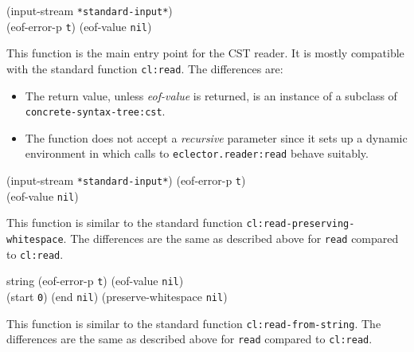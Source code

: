  {\optional (input-stream \texttt{*standard-input*})\\
  (eof-error-p \texttt{t})
  (eof-value \texttt{nil})}

This function is the main entry point for the CST reader.  It is
mostly compatible with the standard \commonlisp{} function
\texttt{cl:read}.  The differences are:

\begin{itemize}
\item The return value, unless \textit{eof-value} is returned, is an
  instance of a subclass of \texttt{concrete-syntax-tree:cst}.
\item The function does not accept a \textit{recursive} parameter
  since it sets up a dynamic environment in which calls to
  \texttt{eclector.reader:read} behave suitably.
\end{itemize}

 {\optional (input-stream \texttt{*standard-input*})
  (eof-error-p \texttt{t})\\
  (eof-value \texttt{nil})}

This function is similar to the standard \commonlisp{} function
\texttt{cl:read-preserving-whitespace}.  The differences are the same
as described above for \texttt{read} compared to \texttt{cl:read}.

 {string \optional
  (eof-error-p \texttt{t})
  (eof-value \texttt{nil})\\
  \key
  (start \texttt{0})
  (end \texttt{nil})
  (preserve-whitespace \texttt{nil})}

This function is similar to the standard \commonlisp{} function
\texttt{cl:read-from-string}.  The differences are the same as
described above for \texttt{read} compared to \texttt{cl:read}.
